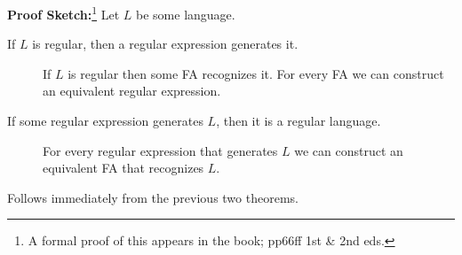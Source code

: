 \documentclass[a4paper,blends,pdf,colorBG,slideColor]{prosper}
\begin{document}
\vspace{.2in}
\begin{center}
\end{center}
\vspace{.2in}
{\bf Proof Sketch:}\footnote{A formal proof of this appears in the book; pp66ff 1st \& 2nd eds.} Let $L$ be some language.
\begin{description}
\item[If $L$ is regular, then a regular expression generates it.] If $L$ is regular then some FA recognizes it.  For every FA we can construct an equivalent regular
expression.
\item[If some regular expression generates $L$, then it is a regular language.] For every
regular expression that generates $L$ we can construct an equivalent FA that
recognizes $L$.
\end{description}
\vspace{.5in}
\es



Follows immediately from the previous two theorems.
\es
\end{document}
